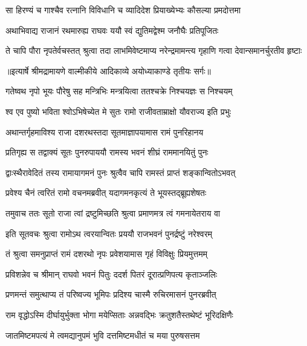 \twolineshloka
{सा हिरण्यं च गाश्चैव रत्नानि विविधानि च}
{व्यादिदेश प्रियाख्येभ्यः कौसल्या प्रमदोत्तमा} %

\twolineshloka
{अथाभिवाद्य राजानं रथमारुह्य राघवः}
{ययौ स्वं द्युतिमद्वेश्म जनौघैः प्रतिपूजितः} %

\fourlineindentedshloka
{ते चापि पौरा नृपतेर्वचस्तत्}
{श्रुत्वा तदा लाभमिवेष्टमाप्य}
{नरेन्द्रमामन्त्य गृहाणि गत्वा}
{देवान्समानर्चुरतीव हृष्टाः} %


{॥इत्यार्षे श्रीमद्रामायणे वाल्मीकीये आदिकाव्ये अयोध्याकाण्डे तृतीयः सर्गः॥}


\twolineshloka
{गतेष्वथ नृपो भूयः पौरेषु सह मन्त्रिभिः}
{मन्त्रयित्वा ततश्चक्रे निश्चयज्ञः स निश्चयम्} %

\twolineshloka
{श्व एव पुष्यो भविता श्वोऽभिषेच्येत मे सुतः}
{रामो राजीवताम्राक्षो यौवराज्य इति प्रभुः} %

\twolineshloka
{अथान्तर्गृहमाविश्य राजा दशरथस्तदा}
{सूतमाज्ञापयामास रामं पुनरिहानय} %

\twolineshloka
{प्रतिगृह्य स तद्वाक्यं सूतः पुनरुपाययौ}
{रामस्य भवनं शीघ्रं राममानयितुं पुनः} %

\twolineshloka
{द्वाःस्थैरावेदितं तस्य रामायागमनं पुनः}
{श्रुत्वैव चापि रामस्तं प्राप्तं शङ्कान्वितोऽभवत्} %

\twolineshloka
{प्रवेश्य चैनं त्वरितं रामो वचनमब्रवीत्}
{यदागमनकृत्यं ते भूयस्तद्ब्रूह्यशेषतः} %

\twolineshloka
{तमुवाच ततः सूतो राजा त्वां द्रष्टुमिच्छति}
{श्रुत्वा प्रमाणमत्र त्वं गमनायेतराय वा} %

\twolineshloka
{इति सूतवचः श्रुत्वा रामोऽथ त्वरयान्वितः}
{प्रययौ राजभवनं पुनर्द्रष्टुं नरेश्वरम्} %

\twolineshloka
{तं श्रुत्वा समनुप्राप्तं रामं दशरथो नृपः}
{प्रवेशयामास गृहं विविक्षुः प्रियमुत्तमम्} %

\twolineshloka
{प्रविशन्नेव च श्रीमान् राघवो भवनं पितुः}
{ददर्श पितरं दूरात्प्रणिपत्य कृताञ्जलिः} %

\twolineshloka
{प्रणमन्तं समुत्थाप्य तं परिष्वज्य भूमिपः}
{प्रदिश्य चास्मै रुचिरमासनं पुनरब्रवीत्} %

\twolineshloka
{राम वृद्धोऽस्मि दीर्घायुर्भुक्ता भोगा मयेप्सिताः}
{अन्नवद्भिः क्रतुशतैस्तथेष्टं भूरिदक्षिणैः} %

\twolineshloka
{जातमिष्टमपत्यं मे त्वमद्यानुपमं भुवि}
{दत्तमिष्टमधीतं च मया पुरुषसत्तम} %

